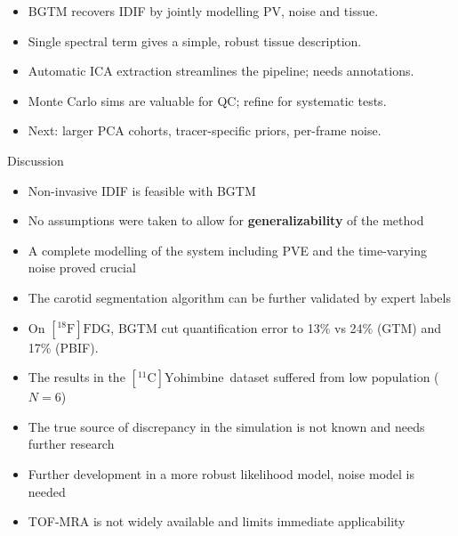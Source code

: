 \documentclass[aspectratio=169]{beamer}
\newcommand{\fdg}{$[^{18}\mathrm{F}]\text{FDG}$}
\newcommand{\yohimbine}{$[^{11}\mathrm{C}]\text{Yohimbine}$}
\begin{document}
\begin{frame}[t]
	\small
	\begin{itemize}
		\item BGTM recovers IDIF by jointly modelling PV, noise and tissue.
		\item Single spectral term gives a simple, robust tissue description.
		\item Automatic ICA extraction streamlines the pipeline; needs annotations.
		\item Monte Carlo sims are valuable for QC; refine for systematic tests.
		\item Next: larger PCA cohorts, tracer-specific priors, per-frame noise.
	\end{itemize}
\end{frame}


\begin{frame}{Discussion}
	\begin{itemize}
		\item Non-invasive IDIF is feasible with BGTM
		\item No assumptions were taken to allow for \textbf{generalizability} of the method
		\item A complete modelling of the system including PVE and the time-varying noise proved crucial
		\item The carotid segmentation algorithm can be further validated by expert labels
		\item On \fdg, BGTM cut quantification error to 13\% vs 24\% (GTM) and 17\% (PBIF).
		\item The results in the \yohimbine\ dataset suffered from low population ($N=6$)
		\item The true source of discrepancy in the simulation is not known and needs further research
		\item Further development in a more robust likelihood model, noise model is needed
		\item TOF-MRA is not widely available and limits immediate applicability
	\end{itemize}
\end{frame}
\end{document}
